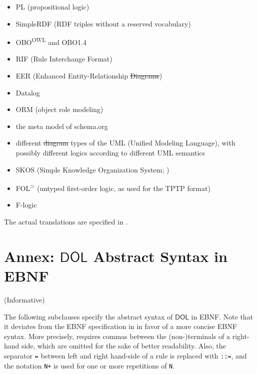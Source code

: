 \documentclass[10pt,fleqn,final]{scrreprt}
\makeatletter
\newcommand*\CommentAuthor{}
\renewcommand*\CommentAuthor{#1}}
\newcommand*\CommentDate{}
\renewcommand*\CommentDate{#1}}
\newcommand*\CommentId{}
\renewcommand*\CommentId{#1}}
\newcommand*\CommentType{}
\renewcommand*\CommentType{#1}}
\newcommand*{\SetCommentColorByType}[1]{%
\edef\localType{{#1}}%
\expandafter\ifstrequal\localType{q-aut}{\colorlet{CommentColor}{red}}{%
\expandafter\ifstrequal\localType{q-all}{\colorlet{CommentColor}{orange}}{%
\expandafter\ifstrequal\localType{todo}{\colorlet{CommentColor}{orange}}{%
\expandafter\ifstrequal\localType{fyi}{\colorlet{CommentColor}{lightgray}}{%
\colorlet{CommentColor}{yellow}}}}}}
\newcommand*{\SetCommentPrefixByType}[1]{%
\edef\localType{{#1}}%
\expandafter\@ifmtarg\localType{%
\edef\CommentPrefix{}%
}{%
\caseupper[q]{#1}%
\edef\CommentPrefix{\thestring: }%
}}
\newcommand*{\initComment}[1]{%
\setkeys{Comment}{#1}%
\SetCommentColorByType{\CommentType}%
\relax%
\SetCommentPrefixByType{\CommentType}%
\relax%
}
\newcommand*{\todonote}[2][]{%
\initComment{#1}%
\pdfcomment[author=\CommentAuthor,color=CommentColor,date=\CommentDate,id=\CommentId]{%
\CommentPrefix
#2}}
\renewcommand*{\todonote}[2][]{%
\initComment{#1}%
\ednote{\CommentPrefix #2}}
\newcommand*{\syntax}[1]{\texttt{#1}}
\newcommand*{\IS}{OMG Specification\xspace}
\newcommand*{\DOL}{\ensuremath{\mathsf{DOL}}\xspace}
\newcommand{\noterefname}{note}
\newcommand{\nref}[1]{\noterefname~\ref{#1}}
\newcommand{\informative}[0]{{\begin{center}{\Large{(Informative})}\end{center}} \bigskip}
\renewcommand{\nref}[1]{\ref{nref-#1}} %
\newcommand{\infannex}[1]{ \chapter{Annex: #1}  \informative }
\providecommand{\DIFadd}[1]{{\protect\color{blue}\uwave{#1}}} %
\providecommand{\DIFdel}[1]{{\protect\color{red}\sout{#1}}}                      %
\providecommand{\DIFaddbegin}{} %
\providecommand{\DIFaddend}{} %
\providecommand{\DIFdelbegin}{} %
\providecommand{\DIFdelend}{} %
\makeatother
\begin{document}
\begin{itemize}
\item PL (propositional logic)
\item SimpleRDF (RDF triples without a reserved vocabulary)
\item OBO\textsuperscript{OWL} and OBO1.4
\item RIF \DIFaddbegin \DIFadd{\nref{RIF} }\DIFaddend (Rule Interchange Format)
\item EER (Enhanced Entity-Relationship \DIFdelbegin \DIFdel{Diagrams}\DIFdelend \DIFaddbegin \DIFadd{Models}\DIFaddend ) %
\item Datalog
\item ORM (object role modeling)
\item the meta model of schema.org
\item different \DIFdelbegin \DIFdel{diagram }\DIFdelend \DIFaddbegin \DIFadd{model }\DIFaddend types of the UML (Unified Modeling Language), with possibly different logics according to different
UML semantics
\item SKOS (Simple Knowledge Organization System; \DIFdelbegin %
\DIFdelend \DIFaddbegin \DIFadd{\nref{SKOS}}\DIFaddend )
\item FOL\textsuperscript{=} (untyped first-order logic, as used for the
TPTP format)
\item F-logic
\end{itemize}

The actual translations are specified in \cite{OntoGraph}.






\infannex{\DOL Abstract Syntax in EBNF}
\label{a:EBNF}


The following subclauses specify the abstract syntax of \DOL in EBNF. Note that it deviates from the EBNF specification in
 \DIFdelbegin %
\DIFdelend \DIFaddbegin \DIFadd{\nref{EBNF} }\DIFaddend in favor of a more concise
EBNF syntax. More precisely, \DIFdelbegin %
\DIFdelend \DIFaddbegin \DIFadd{\nref{EBNF} }\DIFaddend requires commas between the (non-)terminals of a right-hand side, which are omitted 
for the sake of better readability. Also, the separator \syntax{=}
between left and right hand-side of a rule is replaced with \syntax{::=}, and 
 the notation \syntax{N+} is used 
for one or more repetitions of \syntax{N}.
\end{document}
